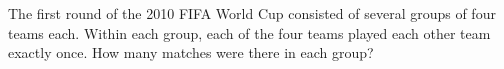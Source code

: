 The first round of the 2010 FIFA World Cup consisted of several groups of four teams each. Within each group, each of the four teams played each other team exactly once. How many matches were there in each group?
